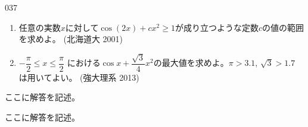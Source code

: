 \begin{thm}{037}{}{}
 \begin{enumerate}
  \item 任意の実数$x$に対して$\cos(2x)+cx^2\ge 1$が成り立つような定数$c$の値の範囲を求めよ。  (北海道大 2001)
  \item $-\dfrac{\pi}{2}\le x \le \dfrac{\pi}{2}$ における$\cos x+\dfrac{\sqrt{3}}{4}x^2$の最大値を求めよ。$\pi>3.1$, $\sqrt{3}>1.7$ は用いてよい。  (強大理系 2013)
 \end{enumerate}
\end{thm}

ここに解答を記述。

ここに解答を記述。